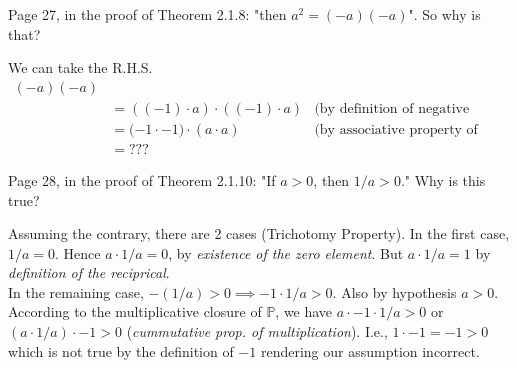 \documentclass[boxes, qed]{homework}
\begin{document}
\newenvironment{amatrix}[1]{%
  \left[\begin{array}{@{}*{#1}{c}|c@{}}
}{%
  \end{array}\right]
}

\newenvironment{augmatrix}[1]{%
  \left[\begin{array}{#1}
}{%
  \end{array}\right]
}

\begin{problem}Page 27, in the proof of Theorem 2.1.8: 
  "then $a^2=(-a)(-a)$". So why is that?
\end{problem}
\begin{solution}We can take the R.H.S. 
  \begin{align*}
      (-a)(-a)\\
      & = ((-1)\cdot{a})\cdot{((-1)\cdot{a})}
      & \text{(by definition of negative numbers)}\\
      & = (-1\cdot{-1)}\cdot{(a\cdot{a})}
      & \text{(by associative property of multiplication)}\\
      & = ???
  \end{align*}
\end{solution}
\begin{problem}Page 28, in the proof of Theorem 2.1.10: 
  "If $a>0$, then $1/a>0$." Why is this true?
\end{problem}
\begin{solution}Assuming the contrary, there are 2 cases (Trichotomy Property).
  In the first case, $1/a=0$. Hence $a\cdot 1/a = 0$, by \textit{existence of the zero element}.
  But $a\cdot{1/a} = 1$ by \textit{definition of the reciprical}.\\

  In the remaining case, $-(1/a) > 0 \implies -1\cdot{1/a} > 0$. Also by hypothesis
  $a>0$. According to the multiplicative closure of $\mathbb{P}$, we have
  $a\cdot{-1}\cdot{1/a} > 0$ or $(a\cdot{1/a})\cdot{-1} > 0$ 
  (\textit{cummutative prop. of multiplication}). I.e., $1\cdot{-1} = -1 > 0$
  which is not true by the definition of $-1$ rendering our assumption incorrect.
\end{solution}
\end{document}
